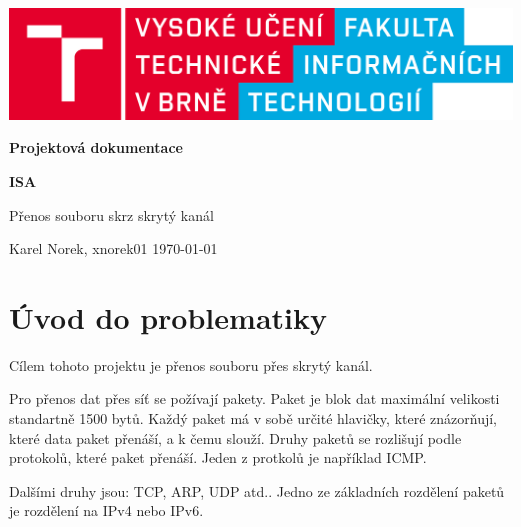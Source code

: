\documentclass[11pt, a4paper]{article}
\begin{document}
\begin{titlepage}
    \begin{center}
        
        \null
        
        \vspace{5cm}
        
        \includegraphics[scale=0.1,keepaspectratio]{img/logo_cz.png}
        
        \vspace{3cm}
       
        {\textbf{\Huge Projektová dokumentace}}
        
        \vspace{0.5cm}
        
        {\textbf{\LARGE ISA}}
        
        \vspace{0.5cm}
        
        {\LARGE Přenos souboru skrz skrytý kanál}
        
        \vspace{5cm}
        
         \vfill
    \end{center}
    {\LARGE Karel Norek, xnorek01 \hfill \today}


\end{titlepage}

\large
{}
\tableofcontents
\clearpage

\setcounter{page}{1}

\section{Úvod do problematiky}
Cílem tohoto projektu je přenos souboru přes skrytý kanál. 

Pro přenos dat přes síť se požívají pakety. Paket je blok dat maximální velikosti standartně 1500 bytů. Každý paket má v sobě určité hlavičky, které znázorňují, které data paket přenáší, a k čemu slouží. Druhy paketů se rozlišují podle protokolů, které paket přenáší. Jeden z protkolů je například ICMP. 

Dalšími druhy jsou: TCP, ARP, UDP atd.. Jedno ze základních rozdělení paketů je rozdělení na IPv4 nebo IPv6. 
\end{document}
